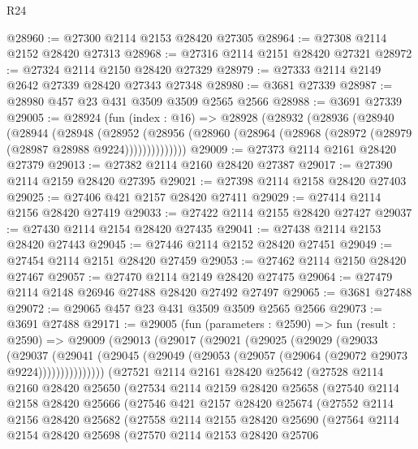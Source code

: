 \begin{lexlean}{R24}
\begin{coremodule}
@28960 := @27300 @2114 @2153 @28420 @27305
@28964 := @27308 @2114 @2152 @28420 @27313
@28968 := @27316 @2114 @2151 @28420 @27321
@28972 := @27324 @2114 @2150 @28420 @27329
@28979 := @27333 @2114 @2149 @2642 @27339 @28420 @27343 @27348
@28980 := @3681 @27339
@28987 := @28980 @457 @23 @431 @3509 @3509 @2565 @2566
@28988 := @3691 @27339
@29005 := @28924
    (fun (index : @16) =>
    @28928
      (@28932
        (@28936
          (@28940
            (@28944
              (@28948
                (@28952
                  (@28956 (@28960 (@28964 (@28968 (@28972 (@28979 (@28987 @28988 @9224))))))))))))))
@29009 := @27373 @2114 @2161 @28420 @27379
@29013 := @27382 @2114 @2160 @28420 @27387
@29017 := @27390 @2114 @2159 @28420 @27395
@29021 := @27398 @2114 @2158 @28420 @27403
@29025 := @27406 @421 @2157 @28420 @27411
@29029 := @27414 @2114 @2156 @28420 @27419
@29033 := @27422 @2114 @2155 @28420 @27427
@29037 := @27430 @2114 @2154 @28420 @27435
@29041 := @27438 @2114 @2153 @28420 @27443
@29045 := @27446 @2114 @2152 @28420 @27451
@29049 := @27454 @2114 @2151 @28420 @27459
@29053 := @27462 @2114 @2150 @28420 @27467
@29057 := @27470 @2114 @2149 @28420 @27475
@29064 := @27479 @2114 @2148 @26946 @27488 @28420 @27492 @27497
@29065 := @3681 @27488
@29072 := @29065 @457 @23 @431 @3509 @3509 @2565 @2566
@29073 := @3691 @27488
@29171 := @29005
    (fun (parameters : @2590) =>
    fun (result : @2590) =>
    @29009
      (@29013
        (@29017
          (@29021
            (@29025
              (@29029
                (@29033
                  (@29037
                    (@29041
                      (@29045 (@29049 (@29053 (@29057 (@29064 (@29072 @29073 @9224)))))))))))))))
    (@27521
      @2114
      @2161
      @28420
      @25642
      (@27528
        @2114
        @2160
        @28420
        @25650
        (@27534
          @2114
          @2159
          @28420
          @25658
          (@27540
            @2114
            @2158
            @28420
            @25666
            (@27546
              @421
              @2157
              @28420
              @25674
              (@27552
                @2114
                @2156
                @28420
                @25682
                (@27558
                  @2114
                  @2155
                  @28420
                  @25690
                  (@27564
                    @2114
                    @2154
                    @28420
                    @25698
                    (@27570
                      @2114
                      @2153
                      @28420
                      @25706

\end{coremodule}
\end{lexlean}

